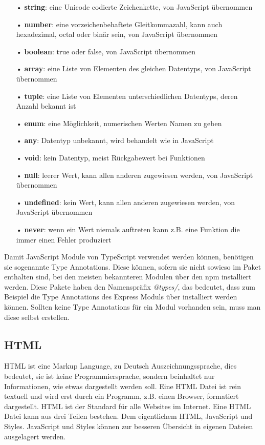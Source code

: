 \begin{itemize}
\item[•] \textbf{string}: eine Unicode codierte Zeichenkette, von JavaScript übernommen
\item[•] \textbf{number}: eine vorzeichenbehaftete Gleitkommazahl, kann auch hexadezimal, octal oder binär sein, von JavaScript übernommen
\item[•] \textbf{boolean}: true oder false, von JavaScript übernommen
\item[•] \textbf{array}: eine Liste von Elementen des gleichen Datentyps, von JavaScript übernommen
\item[•] \textbf{tuple}: eine Liste von Elementen unterschiedlichen Datentyps, deren Anzahl bekannt ist
\item[•] \textbf{enum}: eine Möglichkeit, numerischen Werten Namen zu geben
\item[•] \textbf{any}: Datentyp unbekannt, wird behandelt wie in JavaScript
\item[•] \textbf{void}: kein Datentyp, meist Rückgabewert bei Funktionen
\item[•] \textbf{null}: leerer Wert, kann allen anderen zugewiesen werden, von JavaScript übernommen
\item[•] \textbf{undefined}: kein Wert, kann allen anderen zugewiesen werden, von JavaScript übernommen
\item[•] \textbf{never}: wenn ein Wert niemals auftreten kann z.B. eine Funktion die immer einen Fehler produziert
\end{itemize}

Damit JavaScript Module von TypeScript verwendet werden können, benötigen sie sogenannte Type Annotations. Diese können, sofern sie nicht sowieso im Paket enthalten sind, bei den meisten bekannteren Modulen über den \ac{npm} installiert werden. Diese Pakete haben den Namenspräfix \textit{@types/}, das bedeutet, dass zum Beispiel die Type Annotations des Express Moduls über  installiert werden können. Sollten keine Type Annotations für ein Modul vorhanden sein, muss man diese selbst erstellen.

\subsection{HTML}
\label{sec:vor-html}
\ac{HTML} ist eine Markup Language, zu Deutsch Auszeichnungssprache, dies bedeutet, sie ist keine Programmiersprache, sondern beinhaltet nur Informationen, wie etwas dargestellt werden soll. Eine \ac{HTML} Datei ist rein textuell und wird erst durch ein Programm, z.B. einen Browser, formatiert dargestellt. \ac{HTML} ist der Standard für alle Websites im Internet. Eine \ac{HTML} Datei kann aus drei Teilen bestehen. Dem eigentlichem \ac{HTML}, JavaScript und Styles. JavaScript und Styles können zur besseren Übersicht in eigenen Dateien ausgelagert werden.

